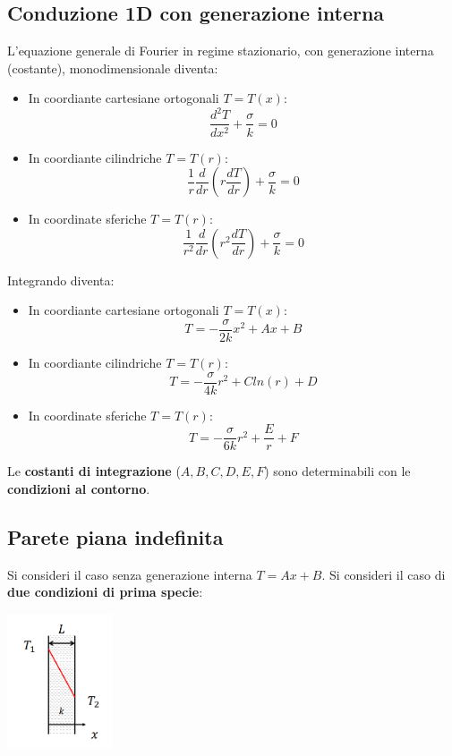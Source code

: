 \subsection{Conduzione 1D con generazione interna}
L’equazione generale di Fourier in regime stazionario, con generazione interna
(costante), monodimensionale diventa:
\begin{itemize}
    \item In coordiante cartesiane ortogonali $T = T(x)$:
    \[
        \frac{d^2T}{dx^2} + \frac{\sigma}{k} = 0
    \]
    \item In coordiante cilindriche $T= T(r)$:
    \[
        \frac{1}{r} \frac{d}{dr}\left(r \frac{dT}{dr}\right) + \frac{\sigma}{k} = 0
    \]
    \item In coordinate sferiche $T =T(r)$:
    \[
        \frac{1}{r^2} \frac{d}{dr}\left(r^2 \frac{dT}{dr}\right) + \frac{\sigma}{k} = 0
    \]
\end{itemize}
Integrando diventa:
\begin{itemize}
    \item In coordiante cartesiane ortogonali $T = T(x)$:
    \[
        T = -\frac{\sigma}{2k} x^2 + Ax + B
    \]
    \item In coordiante cilindriche $T= T(r)$:
    \[
        T = - \frac{\sigma}{4k}r^2 + C ln(r) + D
    \]
    \item In coordinate sferiche $T =T(r)$:
    \[
        T = - \frac{\sigma}{6k}r^2 + \frac{E}{r} + F
    \]
\end{itemize}
Le \textbf{costanti di integrazione} ($A,B,C,D,E,F$) sono determinabili con le \textbf{condizioni al contorno}.
\subsection{Parete piana indefinita}
Si consideri il caso senza generazione interna $T = Ax + B$. \newline
\newline
Si consideri il caso di \textbf{due condizioni di prima specie}:
\begin{center}
    \includegraphics[height=4cm]{../L10/img1.PNG}
\end{center}

